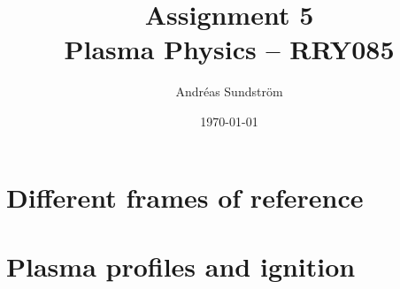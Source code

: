 \documentclass[11pt,a4paper, 
swedish, english %
]{article}
\begin{document}


\title{Assignment 5 \\
{\Large Plasma Physics -- RRY085}}
\author{Andréas Sundström}
\date\today%

\maketitle


\section{Different frames of reference}



\section{Plasma profiles and ignition}






\end{document}
